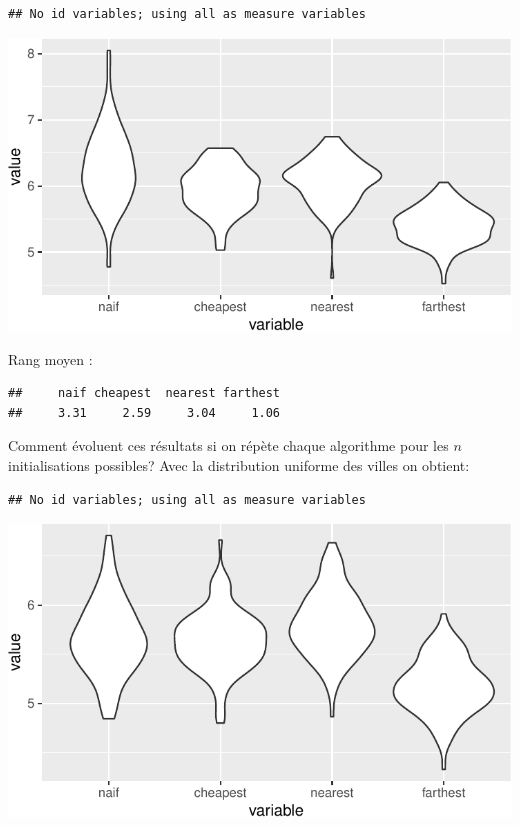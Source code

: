 \documentclass[
]{article}
\begin{document}
\begin{verbatim}
## No id variables; using all as measure variables
\end{verbatim}

\includegraphics{TSP_analyse_files/figure-latex/unnamed-chunk-15-1.pdf}

Rang moyen :

\begin{verbatim}
##     naif cheapest  nearest farthest 
##     3.31     2.59     3.04     1.06
\end{verbatim}

Comment évoluent ces résultats si on répète chaque algorithme pour les
\(n\) initialisations possibles? Avec la distribution uniforme des
villes on obtient:

\begin{verbatim}
## No id variables; using all as measure variables
\end{verbatim}

\includegraphics{TSP_analyse_files/figure-latex/unnamed-chunk-17-1.pdf}
\end{document}

